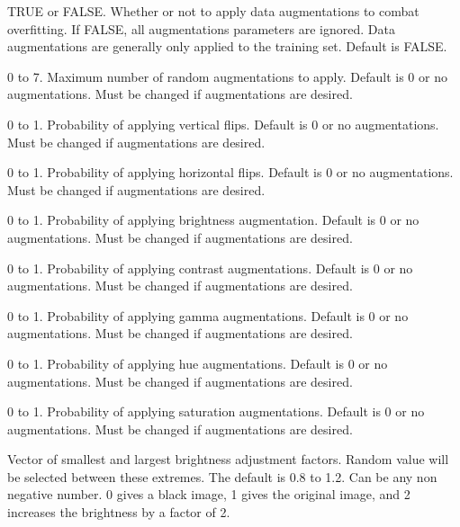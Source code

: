 \documentclass[a4paper]{book}
\begin{document}
\begin{Arguments}
\begin{ldescription}
\item[\code{doAugs}] TRUE or FALSE. Whether or not to apply data augmentations to combat
overfitting. If FALSE, all augmentations parameters are ignored. Data augmentations
are generally only applied to the training set. Default is FALSE.

\item[\code{maxAugs}] 0 to 7. Maximum number of random augmentations to apply. Default is 0
or no augmentations. Must be changed if augmentations are desired.

\item[\code{probVFlip}] 0 to 1. Probability of applying vertical flips. Default is 0
or no augmentations. Must be changed if augmentations are desired.

\item[\code{probHFlip}] 0 to 1. Probability of applying horizontal flips. Default is 0
or no augmentations. Must be changed if augmentations are desired.

\item[\code{probBrightness}] 0 to 1. Probability of applying brightness augmentation.
Default is 0 or no augmentations. Must be changed if augmentations are desired.

\item[\code{probContrast}] 0 to 1. Probability of applying contrast augmentations.
Default is 0 or no augmentations. Must be changed if augmentations are desired.

\item[\code{probGamma}] 0 to 1. Probability of applying gamma augmentations. Default is 0
or no augmentations. Must be changed if augmentations are desired.

\item[\code{probHue}] 0 to 1. Probability of applying hue augmentations. Default is 0
or no augmentations. Must be changed if augmentations are desired.

\item[\code{probSaturation}] 0 to 1. Probability of applying saturation augmentations.
Default is 0 or no augmentations. Must be changed if augmentations are desired.

\item[\code{brightFactor}] Vector of smallest and largest brightness adjustment factors.
Random value will be selected between these extremes. The default is 0.8 to 1.2.
Can be any non negative number. 0 gives a black image, 1 gives the original
image, and 2 increases the brightness by a factor of 2.


\end{ldescription}
\end{Arguments}
\end{document}
